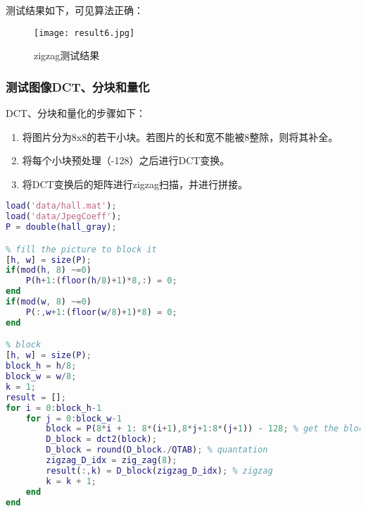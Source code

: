\documentclass[a4paper]{article}
\begin{document}
\par 测试结果如下，可见算法正确：
\begin{figure}[ht]
     \centering
     \texttt{[image: result6.jpg]}
     \caption{zigzag测试结果}
    \label{fig:result 6}
\end{figure}

\subsubsection{测试图像DCT、分块和量化}
\par DCT、分块和量化的步骤如下：
\begin{enumerate}
    \item 将图片分为8x8的若干小块。若图片的长和宽不能被8整除，则将其补全。
    \item 将每个小块预处理（-128）之后进行DCT变换。
    \item 将DCT变换后的矩阵进行zigzag扫描，并进行拼接。
\end{enumerate}
\begin{lstlisting}[language=matlab, caption=DCT、分块和量化]
load('data/hall.mat');
load('data/JpegCoeff');
P = double(hall_gray);

% fill the picture to block it
[h, w] = size(P);
if(mod(h, 8) ~=0)
    P(h+1:(floor(h/8)+1)*8,:) = 0;
end
if(mod(w, 8) ~=0)
    P(:,w+1:(floor(w/8)+1)*8) = 0;
end

% block
[h, w] = size(P);
block_h = h/8;
block_w = w/8;
k = 1;
result = [];
for i = 0:block_h-1
    for j = 0:block_w-1
        block = P(8*i + 1: 8*(i+1),8*j+1:8*(j+1)) - 128; % get the block
        D_block = dct2(block);
        D_block = round(D_block./QTAB); % quantation
        zigzag_D_idx = zig_zag(8);
        result(:,k) = D_block(zigzag_D_idx); % zigzag
        k = k + 1;
    end
end
\end{lstlisting}
\end{document}
